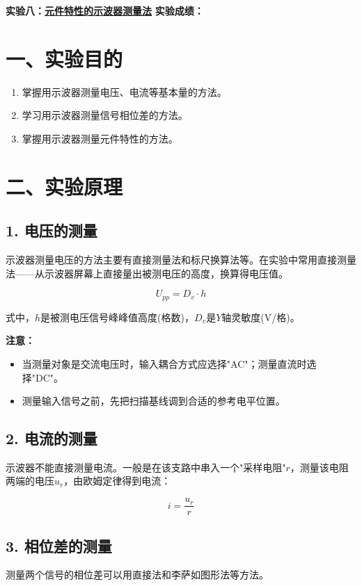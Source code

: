 \documentclass[12pt,a4paper]{article}
\begin{document}
\noindent
{\Large \textbf{实验八：}\underline{\textbf{元件特性的示波器测量法}}} \hfill {\Large \textbf{实验成绩：}\underline{\hspace{3cm}}}
\vspace{0.5cm}

\section*{一、实验目的}
\begin{enumerate}
    \item 掌握用示波器测量电压、电流等基本量的方法。
    \item 学习用示波器测量信号相位差的方法。
    \item 掌握用示波器测量元件特性的方法。
\end{enumerate}

\section*{二、实验原理}

\subsection*{1. 电压的测量}
示波器测量电压的方法主要有直接测量法和标尺换算法等。在实验中常用直接测量法——从示波器屏幕上直接量出被测电压的高度，换算得电压值。

$$U_{pp} = D_v \cdot h$$

式中，$h$是被测电压信号峰峰值高度(格数)，$D_v$是$Y$轴灵敏度(V/格)。

\textbf{注意：}
\begin{itemize}
    \item 当测量对象是交流电压时，输入耦合方式应选择"AC"；测量直流时选择"DC"。
    \item 测量输入信号之前，先把扫描基线调到合适的参考电平位置。
\end{itemize}

\subsection*{2. 电流的测量}
示波器不能直接测量电流。一般是在该支路中串入一个"采样电阻"$r$，测量该电阻两端的电压$u_r$，由欧姆定律得到电流：

$$i = \frac{u_r}{r}$$

\subsection*{3. 相位差的测量}
测量两个信号的相位差可以用直接法和李萨如图形法等方法。
\end{document}
